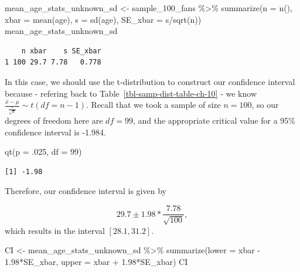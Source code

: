 \documentclass[
  letterpaper,
  DIV=11,
  numbers=noendperiod]{scrreprt}
\newenvironment{Shaded}{\begin{snugshade}}{\end{snugshade}}
\newcommand{\AttributeTok}[1]{\textcolor[rgb]{0.40,0.45,0.13}{#1}}
\newcommand{\DecValTok}[1]{\textcolor[rgb]{0.68,0.00,0.00}{#1}}
\newcommand{\FloatTok}[1]{\textcolor[rgb]{0.68,0.00,0.00}{#1}}
\newcommand{\FunctionTok}[1]{\textcolor[rgb]{0.28,0.35,0.67}{#1}}
\newcommand{\NormalTok}[1]{\textcolor[rgb]{0.00,0.23,0.31}{#1}}
\newcommand{\OtherTok}[1]{\textcolor[rgb]{0.00,0.23,0.31}{#1}}
\newcommand{\SpecialCharTok}[1]{\textcolor[rgb]{0.37,0.37,0.37}{#1}}
\theoremstyle{definition}
\theoremstyle{remark}
\begin{document}
\begin{Shaded}
\begin{Highlighting}[]
\NormalTok{mean\_age\_stats\_unknown\_sd }\OtherTok{\textless{}{-}}\NormalTok{ sample\_100\_fans }\SpecialCharTok{\%\textgreater{}\%} 
  \FunctionTok{summarize}\NormalTok{(}\AttributeTok{n =} \FunctionTok{n}\NormalTok{(),}
            \AttributeTok{xbar =} \FunctionTok{mean}\NormalTok{(age),}
            \AttributeTok{s =} \FunctionTok{sd}\NormalTok{(age),}
            \AttributeTok{SE\_xbar =}\NormalTok{ s}\SpecialCharTok{/}\FunctionTok{sqrt}\NormalTok{(n))}
\NormalTok{mean\_age\_stats\_unknown\_sd}
\end{Highlighting}
\end{Shaded}

\begin{verbatim}
    n xbar    s SE_xbar
1 100 29.7 7.78   0.778
\end{verbatim}

In this case, we should use the t-distribution to construct our
confidence interval because - refering back to
Table~\ref{tbl-samp-dist-table-ch-10} - we know
\(\frac{\bar{x} - \mu}{\frac{s}{\sqrt{n}}} \sim t(df = n-1)\). Recall
that we took a sample of size \(n = 100\), so our degrees of freedom
here are \(df = 99\), and the appropriate critical value for a 95\%
confidence interval is -1.984.

\begin{Shaded}
\begin{Highlighting}[]
\FunctionTok{qt}\NormalTok{(}\AttributeTok{p =}\NormalTok{ .}\DecValTok{025}\NormalTok{, }\AttributeTok{df =} \DecValTok{99}\NormalTok{)}
\end{Highlighting}
\end{Shaded}

\begin{verbatim}
[1] -1.98
\end{verbatim}

Therefore, our confidence interval is given by

\[29.7 \pm 1.98*\frac{7.78}{\sqrt{100}},\] which results in the interval
\([28.1, 31.2]\).

\begin{Shaded}
\begin{Highlighting}[]
\NormalTok{CI }\OtherTok{\textless{}{-}}\NormalTok{ mean\_age\_stats\_unknown\_sd }\SpecialCharTok{\%\textgreater{}\%} 
  \FunctionTok{summarize}\NormalTok{(}\AttributeTok{lower =}\NormalTok{ xbar }\SpecialCharTok{{-}} \FloatTok{1.98}\SpecialCharTok{*}\NormalTok{SE\_xbar,}
            \AttributeTok{upper =}\NormalTok{ xbar }\SpecialCharTok{+} \FloatTok{1.98}\SpecialCharTok{*}\NormalTok{SE\_xbar)}
\NormalTok{CI}
\end{Highlighting}
\end{Shaded}
\end{document}
